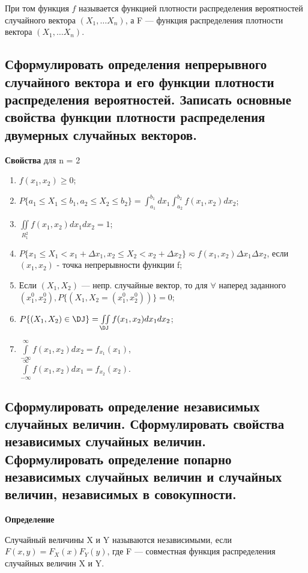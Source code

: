 При том функция $f$ называется функцией плотности распределения вероятностей случайного вектора $(X_1, \dots X_n)$, а F --- функция распределения плотности вектора $(X_1, \dots X_n)$.

\subsection{Сформулировать определения непрерывного случайного вектора и его функции плотности распределения вероятностей. Записать основные свойства функции плотности распределения двумерных случайных векторов.}

\textbf{Свойства} для n = 2

\begin{enumerate}[label=\arabic*.]
	\item $f(x_1, x_2) \geq 0$;
	\item $P\{a_1 \leq X_1 \leq b_1, a_2 \leq X_2 \leq b_2\} = \int_{a_1}^{b_1}dx_1\int_{a_2}^{b_2}f(x_1, x_2)dx_2$;
	\item $\iint\limits_{R_1^2} f(x_1, x_2)dx_1dx_2 = 1$;
	\item $P\{x_1 \leq X_1 < x_1 + \Delta x_1, x_2 \leq X_2 < x_2 + \Delta x_2\} \eqsim f(x_1, x_2) \Delta x_1 \Delta x_2$, если $(x_1, x_2)$ - точка непрерывности функции f;
	\item Если $(X_1, X_2)$ --- непр. случайные вектор, то для $\forall$ наперед заданного $(x_1^0, x_2^0), P\{(X_1, X_2 = (x_1^0, x_2^0))\} = 0$;
	\item $P\{(X_1, X_2) \in \DJ\} = \iint\limits_{\DJ}f(x_1, x_2)dx_1dx_2$;
	\item $\int\limits_{-\infty}^{\infty}f(x_1, x_2)dx_2 = f_{x_1}(x_1)$, \\  $\int\limits_{-\infty}^{\infty}f(x_1, x_2)dx_1 = f_{x_2}(x_2)$.
\end{enumerate}

\subsection{Сформулировать определение независимых случайных величин. Сформулировать свойства независимых случайных величин. Сформулировать определение попарно независимых случайных величин и случайных величин, независимых в совокупности.}

\textbf{Определение}

Случайный величины X и Y называются независимыми, если $F(x, y) = F_X(x)F_Y(y)$, где F --- совместная функция распределения случайных величин X и Y.

